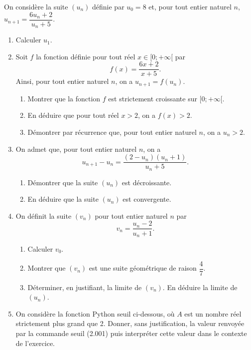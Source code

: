 \documentclass[11pt,fleqn, openany]{book} %
\begin{document}
\begin{exercise}[topic=lim14, subtitle={(Réunion 2023)}]
On considère la suite $(u_n)$ définie par $u_0=8$ et, pour tout entier naturel $n$, $u_{n+1}=\dfrac{6u_n+2}{u_n+5}$.
\begin{enumerate}
\item Calculer $u_1$.
\item Soit $f$ la fonction définie pour tout réel  $x\in [0;+\infty[$ par
\[f(x)=\dfrac{6x+2}{x+5}.\]
Ainsi, pour tout entier naturel $n$, on a $u_{n+1}=f(u_n)$.
\begin{enumerate}
\item Montrer que la fonction $f$ est strictement croissante sur $[0;+\infty [$.
\item En déduire que pour tout réel $x>2$, on a $f(x)>2$.
\item Démontrer par récurrence que, pour tout entier naturel $n$, on a $u_n >2$.
\end{enumerate}
\item On admet que, pour tout entier naturel $n$, on a 
\[u_{n+1}-u_n=\dfrac{(2-u_n)(u_n+1)}{u_n+5}.\]
\begin{enumerate}\item Démontrer que la suite $(u_n)$ est décroissante.
\item En déduire que la suite $(u_n)$ est convergente.\end{enumerate}

\item On définit la suite $(v_n)$ pour tout entier naturel $n$ par 
\[v_n=\dfrac{u_n-2}{u_n+1}.\]
\begin{enumerate}
\item Calculer $v_0$.
\item Montrer que $(v_n)$ est une suite géométrique de raison $\dfrac{4}{7}$.
\item Déterminer, en justifiant, la limite de $(v_n)$. En déduire la limite de $(u_n)$.
\end{enumerate}
\item On considère la fonction Python seuil ci-dessous, où $A$ est un nombre réel strictement plus grand que 2. Donner, sans justification, la valeur renvoyée par la commande seuil (2.001) puis
interpréter cette valeur dans le contexte de l'exercice.



\end{enumerate}
\end{exercise}
\end{document}
